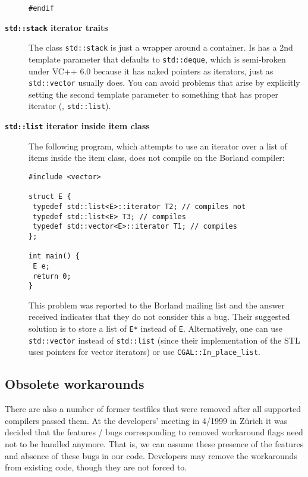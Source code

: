\begin{description}
\begin{verbatim}
#endif
\end{verbatim}

\item[\textbf{{\tt std::stack} iterator traits}]
The class \texttt{std::stack} is just a wrapper around a container.
Is has a 2nd template parameter that defaults to \texttt{std::deque},
which is semi-broken under VC++ 6.0 because it has naked pointers as 
iterators, just as \texttt{std::vector} usually does.  You can avoid
problems that arise by explicitly setting the second template parameter
to something that has proper iterator (\eg, \texttt{std::list}).

\item[\textbf{{\tt std::list} iterator inside item class}]

The following program, which attempts to use an iterator over a list of
items inside the item class, does not compile on the Borland compiler:

\begin{verbatim}
#include <vector>

struct E {
 typedef std::list<E>::iterator T2; // compiles not
 typedef std::list<E> T3; // compiles
 typedef std::vector<E>::iterator T1; // compiles
};

int main() {
 E e;
 return 0;
}
\end{verbatim}

This problem was reported to the Borland mailing list and the answer received
indicates that they do not consider this a bug.  Their suggested solution
is to store a list of \texttt{E*} instead of \texttt{E}. Alternatively, one
can use \texttt{std::vector} instead of \texttt{std::list} (since their
implementation of the STL uses pointers for vector iterators) or use 
\texttt{CGAL::In\_place\_list}.

\end{description}

\subsection{Obsolete workarounds}
\label{sec:obsolete_workarounds}

\noindent 
There are also a number of former testfiles that were removed 
after all supported compilers passed them. At the developers' meeting
in 4/1999 in Z\"urich it was decided that the features / bugs corresponding
to removed workaround flags need not to be handled anymore. That is, we
can assume these presence of the features and absence of these bugs in our
code. Developers may remove the workarounds from existing code, though
they are not forced to.

